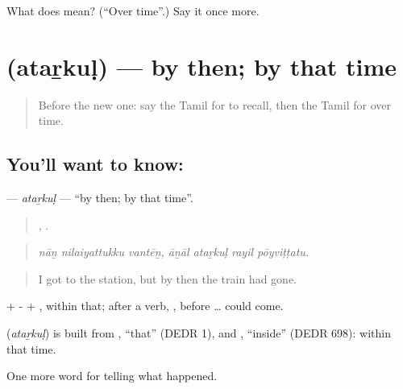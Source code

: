 \begin{tcolorbox}[breakable,colback=teal!4,colframe=teal!35!black,title={Before you move on}]
What does  mean? (\textquotedblleft{}Over time\textquotedblright{}.) Say it once more.
\end{tcolorbox}
\section[\texorpdfstring{\ta{அதற்குள்} (ataṟkuḷ)}{அதற்குள் (ataṟkuḷ)}]{ (ataṟkuḷ) — by then; by that time}

\label{lesson:TA-C314-atarkul}



\begin{quote}
Before the new one: say the Tamil for to recall, then the Tamil for over time.
\end{quote}

\subsection*{You'll want to know: }
\textbf{} — \emph{ataṟkuḷ} — \textquotedblleft{}by then; by that time\textquotedblright{}.

\begin{quote}
  ,    .
\end{quote}

\begin{quote}
\emph{nāṉ nilaiyattukku vantēṉ, āṉāl ataṟkuḷ rayil pōyviṭṭatu.}
\end{quote}

\begin{quote}
I got to the station, but by then the train had gone.
\end{quote}

 + - + , within that; after a verb, , before … could come.

\begin{cousinweb}
\textbf{} (\emph{ataṟkuḷ}) is built from , \textquotedblleft{}that\textquotedblright{} (DEDR 1), and , \textquotedblleft{}inside\textquotedblright{} (DEDR 698): within that time.
\end{cousinweb}

\begin{grammarlens}[title={What you've built}]
One more word for telling what happened.
\end{grammarlens}

